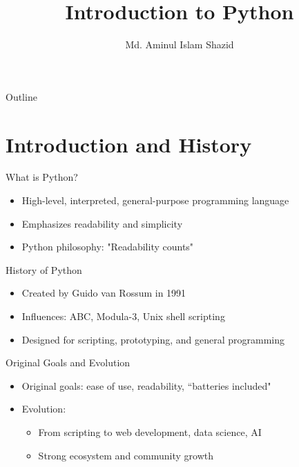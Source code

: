 \documentclass[12pt, aspectratio=169]{beamer}
\title{Introduction to Python}
\author{Md. Aminul Islam Shazid}
\date{}
\begin{document}
    {
		\addtocounter{framenumber}{-2}    %

		\begin{frame}
			\titlepage
		\end{frame}

		\begin{frame}{Outline}
            \vfill
			\tableofcontents[subsectionstyle=hide]
            \vfill
		\end{frame}
	}

    \section{Introduction and History}

    \begin{frame}{What is Python?}
        \begin{itemize}
            \item High-level, interpreted, general-purpose programming language
            \item Emphasizes readability and simplicity
            \item Python philosophy: "Readability counts"
        \end{itemize}
    \end{frame}


    \begin{frame}{History of Python}
        \begin{itemize}
            \item Created by Guido van Rossum in 1991
            \item Influences: ABC, Modula-3, Unix shell scripting
            \item Designed for scripting, prototyping, and general programming
        \end{itemize}
    \end{frame}


    \begin{frame}{Original Goals and Evolution}
        \begin{itemize}
            \item Original goals: ease of use, readability, ``batteries included"
            \item Evolution:
            \begin{itemize}
                \item From scripting to web development, data science, AI
                \item Strong ecosystem and community growth
            \end{itemize}
        \end{itemize}
    \end{frame}
\end{document}
